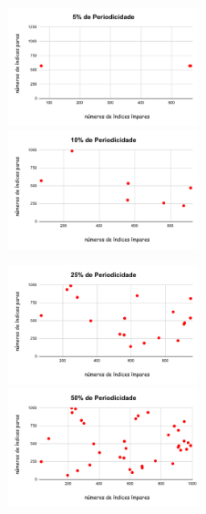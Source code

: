         \begin{figure}[H] 
            \centering
                \includegraphics[width=0.496\textwidth]{5dePeriodicidade.pdf}
                \includegraphics[width=0.496\textwidth]{10dePeriodicidade.pdf}
                \label{fig:Desempenho}
        \end{figure}
        
         \begin{figure}[H] 
            \centering
                \includegraphics[width=0.496\textwidth]{25dePeriodicidade.pdf}
                \includegraphics[width=0.496\textwidth]{50dePeriodicidade.pdf}
                     \label{fig:Desempenho}
        \end{figure}
        
